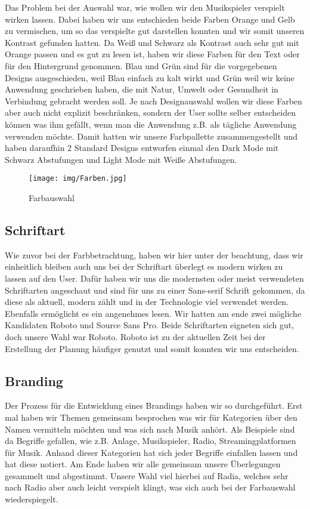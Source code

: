 \documentclass{article}
\begin{document}
 \noindent Das Problem bei der Auswahl war, wie wollen wir den Musikspieler verspielt wirken lassen. Dabei haben wir uns entschieden beide Farben Orange und Gelb zu vermischen, um so das verspielte gut darstellen konnten und wir somit unseren Kontrast gefunden hatten. Da Weiß und Schwarz als Kontrast auch sehr gut mit Orange passen und es gut zu lesen ist, haben wir diese Farben für den Text oder für den Hintergrund genommen. Blau und Grün sind für die vorgegebenen Designs ausgeschieden, weil Blau einfach zu kalt wirkt und Grün weil wir keine Anwendung geschrieben haben, die mit Natur, Umwelt oder Gesundheit in Verbindung gebracht werden soll. 
 Je nach Designauswahl wollen wir diese Farben aber auch nicht explizit beschränken, sondern der User sollte selber entscheiden können was ihm gefällt, wenn man die Anwendung z.B. als tägliche Anwendung verwenden möchte.
 Damit hatten wir unsere Farbpallette zusammengestellt und haben daraufhin 2 Standard Designs entworfen einmal den Dark Mode mit Schwarz Abstufungen und Light Mode mit Weiße Abstufungen.
 \begin{figure}[t]
 \centering
 \texttt{[image: img/Farben.jpg]}
 \caption{Farbauswahl}
 \label{fig:farbauswahl}
\end{figure}

\newpage
\subsection{Schriftart}
Wie zuvor bei der Farbbetrachtung, haben wir hier unter der beachtung, dass wir einheitlich bleiben auch uns bei der Schriftart überlegt es modern wirken zu lassen auf den User. Dafür haben wir uns die modernsten oder meist verwendeten Schriftarten angeschaut und sind für uns zu einer Sans-serif Schrift gekommen, da diese als aktuell, modern zählt und in der Technologie viel verwendet werden. Ebenfalls ermöglicht es ein angenehmes lesen. Wir hatten am ende zwei mögliche Kandidaten Roboto und Source Sans Pro. Beide Schriftarten eigneten sich gut, doch unsere Wahl war Roboto. Roboto ist zu der aktuellen Zeit bei der Erstellung der Planung häufiger genutzt und somit konnten wir uns entscheiden.

\subsection{Branding}
Der Prozess für die Entwicklung eines Brandings haben wir so durchgeführt. Erst mal haben wir Themen gemeinsam besprochen was wir für Kategorien über den Namen vermitteln möchten und was sich nach Musik anhört. Als Beispiele sind da Begriffe gefallen, wie z.B. Anlage, Musikspieler, Radio, Streamingplatformen für Musik. Anhand dieser Kategorien hat sich jeder Begriffe einfallen lassen und hat diese notiert. Am Ende haben wir alle gemeinsam unsere Überlegungen gesammelt und abgestimmt. Unsere Wahl viel hierbei auf Radia, welches sehr nach Radio aber auch leicht verspielt klingt, was sich auch bei der Farbauswahl wiederspiegelt.
\newpage
\end{document}
